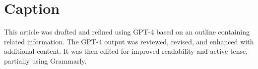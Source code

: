 \documentclass[a4paper, 11pt]{article}
\begin{document}


    \section*{Caption}
    This article was drafted and refined using GPT-4 based on an outline containing related information. The GPT-4 output was reviewed, revised, and enhanced with additional content. It was then edited for improved readability and active tense, partially using Grammarly.
\end{document}
